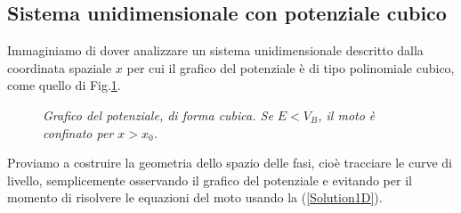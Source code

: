 \documentclass[a4paper,openany]{article}
\begin{document}
	\subsection{Sistema unidimensionale con potenziale cubico}
	Immaginiamo di dover analizzare un sistema unidimensionale descritto dalla coordinata spaziale $x$ per cui il grafico del potenziale è di tipo polinomiale cubico, come quello di Fig.\ref{Fig1}.
	\begin{figure}
		\centering
		\caption{\textit{Grafico del potenziale, di forma cubica. Se $E<V_B$, il moto è confinato per $x>x_0$.}}
		\label{Fig1}
	\end{figure}
	Proviamo a costruire la geometria dello spazio delle fasi, cioè tracciare le curve di livello, semplicemente osservando il grafico del potenziale e evitando per il momento di risolvere le equazioni del moto usando la (\ref{Solution1D}).
	
\end{document}
